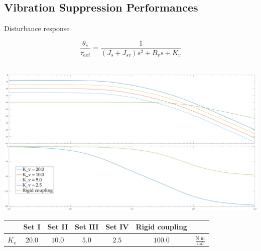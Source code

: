 \documentclass[10pt]{beamer}
\begin{document}
\subsection*{Vibration Suppression Performances}
\begin{frame}{Disturbance response}
	
  \begin{equation*}
    \dfrac{\theta_s}{\tau_{ext}} = \dfrac{1}{(J_s + J_{sv}) s^2 + B_v s + K_v}
  \end{equation*}\\
  \begin{center}
    \includegraphics[width=\textwidth, height=0.45\textwidth]{../reportTeleop/Images/bodo}\\
    \bigskip
    \begin{tabular}{c|c c c c c c}
       & Set I & Set II & Set III & Set IV & Rigid coupling & \\
      \midrule 
	    $K_{v}$ & $ 20.0 $ & $ 10.0 $ & $ 5.0 $ & $ 2.5 $ & $ 100.0 $ & $ \frac{\text{N} \cdot \text{m}}{\text{rad}} $ \\
    \end{tabular}
  \end{center}

\end{frame}
\end{document}
